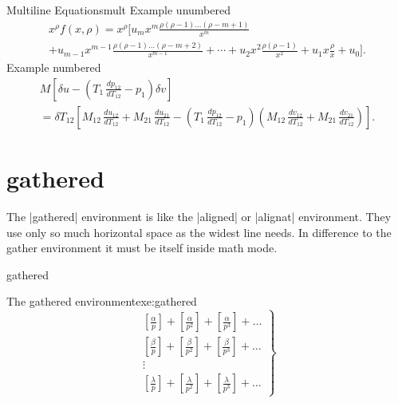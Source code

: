\begin{texexample}{Multiline Equations}{mult}
Example unumbered
\begin{multline*}
x^{\rho}f(x, \rho) = x^{\rho} \Big [ u_{m}x^{m}\frac{\rho(\rho-1)\ldots (\rho-m+1)}{x^{m}} \\
                   + u_{m-1}x^{m-1}\frac{\rho(\rho-1)\ldots (\rho-m+2)}{x^{m-1}}+ \dotsb
                   + u_{2}x^{2}\frac{\rho(\rho-1)}{x^2}+u_{1}x\frac{\rho}{x}+u_0 \Big ].
\end{multline*}
Example  numbered
\begin{multline}
M \left[\delta u - \left(T_1\, \frac{dp_{12}}{dT_{12}} - p_1\right) \delta v\right] \\
= \delta T_{12} \left[M_{12}\, \frac{du_{12}}{dT_{12}} + M_{21}\, \frac{du_{21}}{dT_{12}}
  - \left(T_1\, \frac{dp_{12}}{dT_{12}} - p_1\right)
    \left(M_{12}\, \frac{dv_{12}}{dT_{12}}
        + M_{21}\, \frac{dv_{21}}{dT_{12}}\right)\right].
\end{multline}
\end{texexample}


\section{gathered}

The |gathered| environment is like the |aligned| or |alignat| environment. They use
only so much horizontal space as the widest line needs. In difference to the gather
environment it must be itself inside math mode.

\begin{docEnvironment}{gathered}{}
\end{docEnvironment}

\begin{texexample}{The gathered environment}{exe:gathered}
\[
  \left .
   \begin{gathered}
    \left [ \frac{\alpha}{p} \right ] +
    \left [ \frac{\alpha}{p^2} \right ] +
    \left [ \frac{\alpha}{p^3} \right ] +
    \ldots \\
    \left [ \frac{\beta}{p} \right ] +
    \left [ \frac{\beta}{p^2} \right ] +
    \left [ \frac{\beta}{p^3} \right ] +
    \ldots \\
      \vdots \\
    \left [ \frac{\lambda}{p} \right ] +
    \left [ \frac{\lambda}{p^2} \right ] +
    \left [ \frac{\lambda}{p^3} \right ] +
    \ldots
   \end{gathered}
  \right \} \tag{B}
\]
\end{texexample}

